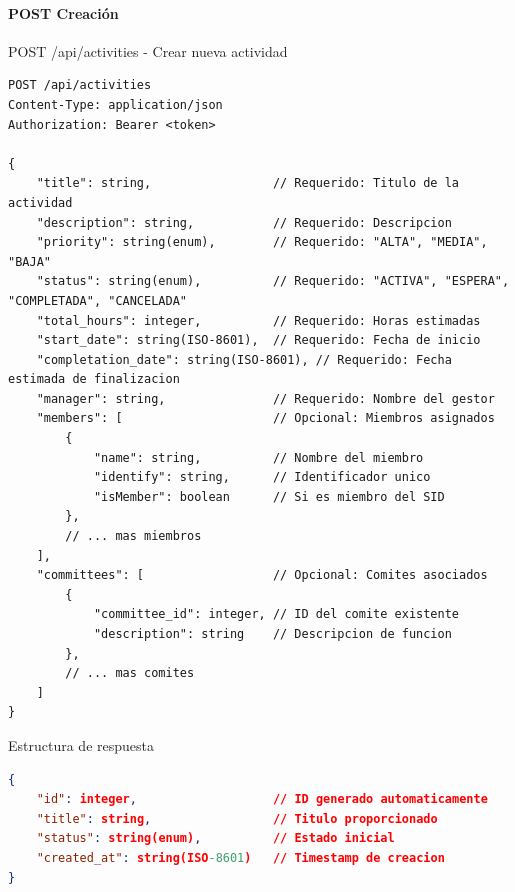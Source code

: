 \documentclass[11pt,a4paper]{article}
\begin{document}
\paragraph{POST Creación}
\begin{center}
	\begin{minipage}{\textwidth}
		\begin{codebox}{POST /api/activities - Crear nueva actividad}
			\begin{lstlisting}[language=HTTP]
POST /api/activities
Content-Type: application/json
Authorization: Bearer <token>

{
    "title": string,                 // Requerido: Titulo de la actividad
    "description": string,           // Requerido: Descripcion
    "priority": string(enum),        // Requerido: "ALTA", "MEDIA", "BAJA"
    "status": string(enum),          // Requerido: "ACTIVA", "ESPERA", "COMPLETADA", "CANCELADA"
    "total_hours": integer,          // Requerido: Horas estimadas
    "start_date": string(ISO-8601),  // Requerido: Fecha de inicio
    "completation_date": string(ISO-8601), // Requerido: Fecha estimada de finalizacion
    "manager": string,               // Requerido: Nombre del gestor
    "members": [                     // Opcional: Miembros asignados
        {
            "name": string,          // Nombre del miembro
            "identify": string,      // Identificador unico
            "isMember": boolean      // Si es miembro del SID
        },
        // ... mas miembros
    ],
    "committees": [                  // Opcional: Comites asociados
        {
            "committee_id": integer, // ID del comite existente
            "description": string    // Descripcion de funcion
        },
        // ... mas comites
    ]
}
\end{lstlisting}
		\end{codebox}
	\end{minipage}
\end{center}

\begin{center}
	\begin{minipage}{\textwidth}
		\begin{codebox}{Estructura de respuesta}
			\begin{lstlisting}[language=json]
{
    "id": integer,                   // ID generado automaticamente
    "title": string,                 // Titulo proporcionado
    "status": string(enum),          // Estado inicial
    "created_at": string(ISO-8601)   // Timestamp de creacion
}
\end{lstlisting}
		\end{codebox}
	\end{minipage}
\end{center}
\end{document}
